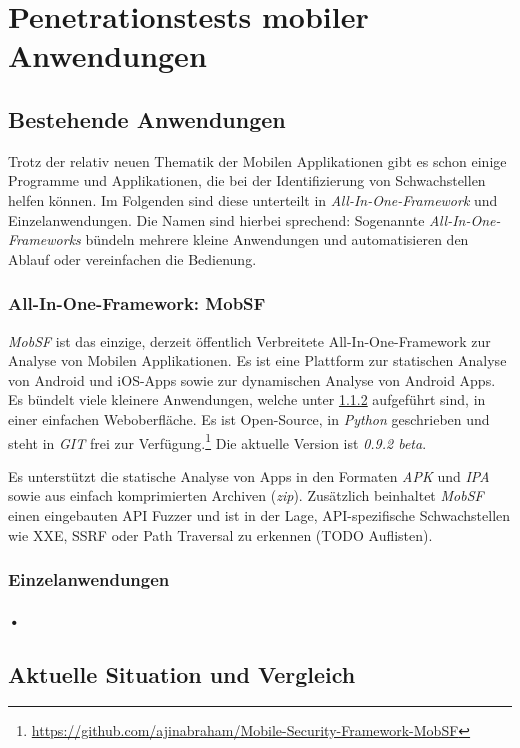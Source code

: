 \chapter{Penetrationstests mobiler Anwendungen}
	\section{Bestehende Anwendungen}
	Trotz der relativ neuen Thematik der Mobilen Applikationen gibt es schon einige Programme und Applikationen, die bei der Identifizierung von Schwachstellen helfen können. Im Folgenden sind diese unterteilt in \textit{All-In-One-Framework} und Einzelanwendungen. Die Namen sind hierbei sprechend: Sogenannte \textit{All-In-One-Frameworks} bündeln mehrere kleine Anwendungen und automatisieren den Ablauf oder vereinfachen die Bedienung.
		\subsection{All-In-One-Framework: MobSF}
		\textit{MobSF} ist das einzige, derzeit öffentlich Verbreitete All-In-One-Framework zur Analyse von Mobilen Applikationen. Es ist eine Plattform zur statischen Analyse von Android und iOS-Apps sowie zur dynamischen Analyse von Android Apps. Es bündelt viele kleinere Anwendungen, welche unter \ref{Pen:Eingelanwendungen} aufgeführt sind, in einer einfachen Weboberfläche. Es ist Open-Source, in \textit{Python} geschrieben und steht in \textit{GIT} frei zur Verfügung.\footnote{\url{https://github.com/ajinabraham/Mobile-Security-Framework-MobSF}} Die aktuelle Version ist \textit{0.9.2 beta}.
		
		Es unterstützt die statische Analyse von Apps in den Formaten \textit{APK} und \textit{IPA} sowie aus einfach komprimierten Archiven (\textit{zip}). Zusätzlich beinhaltet \textit{MobSF} einen eingebauten API Fuzzer und ist in der Lage, API-spezifische Schwachstellen wie XXE, SSRF oder Path Traversal zu erkennen (TODO Auflisten).
		\subsection{Einzelanwendungen}
		\label{Pen:Eingelanwendungen}
			\subsubsection{•}
	\section{Aktuelle Situation und Vergleich}
